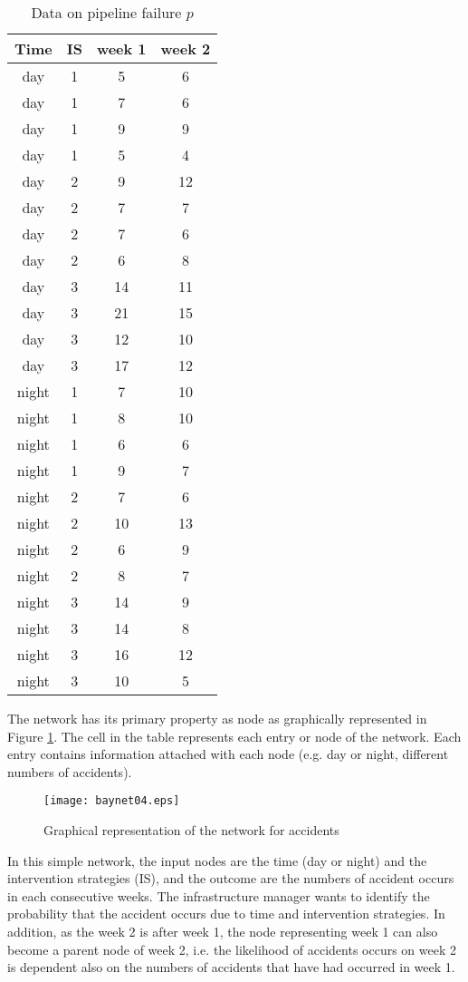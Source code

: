 \begin{table}
	\centering
	\caption{Data on pipeline failure $p$} \label{tblbayes5}
\begin{tabular}{|c|c|c|c|}
\hline
Time & IS & week 1 & week 2 \\ 
\hline
day & 1 & 5 & 6 \\ 
\hline
day & 1 & 7 & 6 \\ 
\hline
day & 1 & 9 & 9 \\ 
\hline
day & 1 & 5 & 4 \\ 
\hline
day & 2 & 9 & 12 \\ 
\hline
day & 2 & 7 & 7 \\ 
\hline
day & 2 & 7 & 6 \\ 
\hline
day & 2 & 6 & 8 \\ 
\hline
day & 3 & 14 & 11 \\ 
\hline
day & 3 & 21 & 15 \\ 
\hline
day & 3 & 12 & 10 \\ 
\hline
day & 3 & 17 & 12 \\ 
\hline
night & 1 & 7 & 10 \\ 
\hline
night & 1 & 8 & 10 \\ 
\hline
night & 1 & 6 & 6 \\ 
\hline
night & 1 & 9 & 7 \\ 
\hline
night & 2 & 7 & 6 \\ 
\hline
night & 2 & 10 & 13 \\ 
\hline
night & 2 & 6 & 9 \\ 
\hline
night & 2 & 8 & 7 \\ 
\hline
night & 3 & 14 & 9 \\ 
\hline
night & 3 & 14 & 8 \\ 
\hline
night & 3 & 16 & 12 \\ 
\hline
night & 3 & 10 & 5 \\ 
\hline
\end{tabular}
\end{table}
The network has its primary property as node as graphically represented in Figure \ref{baynet04}. The cell
in the table represents each entry or node of the network. Each entry contains information
attached with each node (e.g. day or night, different numbers of accidents).

\begin{figure}[h]
\begin{center}
\texttt{[image: baynet04.eps]}
\caption{Graphical representation of the network for accidents}\label{baynet04}
\end{center}
\end{figure}
In this simple network, the input nodes are the time (day or night) and the intervention
strategies (IS), and the outcome are the numbers of accident occurs in each consecutive
weeks. The infrastructure manager wants to identify the probability that the accident occurs
due to time and intervention strategies. In addition, as the week 2 is after week 1, the node
representing week 1 can also become a parent node of week 2, i.e. the likelihood of accidents
occurs on week 2 is dependent also on the numbers of accidents that have had occurred in
week 1.

